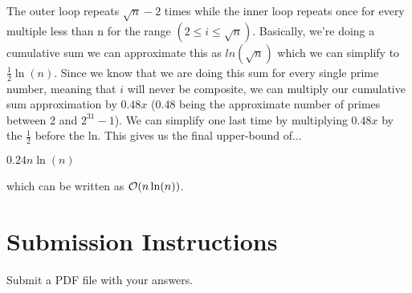 \documentclass{homework}
\begin{document}
\begin{sol}
The outer loop repeats $\sqrt{n} - 2$ times while the inner loop 
repeats once for every multiple less than n for the range $(2 \leq i \leq \sqrt{n})$.
Basically, we're doing a cumulative sum we can approximate this as $ln(\sqrt{n})$ which we can simplify to 
$\frac{1}{2}\ln(n)$. Since we know that we are doing this sum for every single prime number, meaning that $i$ will 
never be composite, we can multiply our cumulative sum approximation by $0.48x$ (0.48 being the approximate number 
of primes between 2 and $2^{31}-1$). We can simplify one last time by multiplying $0.48x$ by the $\frac{1}{2}$ before the ln. This gives us the final upper-bound of... \bigbreak

$0.24n\ln(n)$ \bigbreak

which can be written as $\mathcal{O}(n\ln(n))$.
\end{sol}
  
\section*{Submission Instructions}
Submit a PDF file with your answers.
\end{document}
